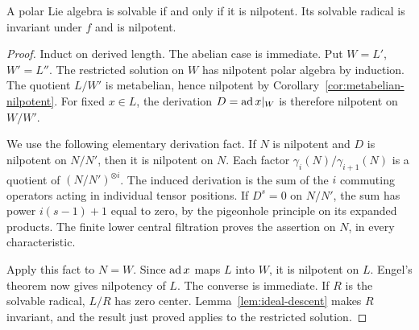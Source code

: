 \begin{theorem}\label{thm:solvable-nilpotent}
A polar Lie algebra is solvable if and only if it is nilpotent.
Its solvable radical is invariant under \(f\) and is nilpotent.
\end{theorem}
\begin{proof}
Induct on derived length. The abelian case is immediate.
Put \(W=L'\), \(W'=L''\). The restricted solution on \(W\) has
nilpotent polar algebra by induction. The quotient \(L/W'\) is
metabelian, hence nilpotent by Corollary~\ref{cor:metabelian-nilpotent}.
For fixed \(x\in L\), the derivation \(D=\operatorname{ad} x|_W\) is therefore
nilpotent on \(W/W'\).

We use the following elementary derivation fact. If \(N\) is nilpotent
and \(D\) is nilpotent on \(N/N'\), then it is nilpotent on \(N\).
Each factor \(\gamma_i(N)/\gamma_{i+1}(N)\) is a quotient of
\((N/N')^{\otimes i}\). The induced derivation is the sum of the \(i\)
commuting operators acting in individual tensor positions.
If \(D^s=0\) on \(N/N'\), the sum has power
\(i(s-1)+1\) equal to zero, by the pigeonhole principle on its expanded
products. The finite lower central filtration proves the assertion on
\(N\), in every characteristic.

Apply this fact to \(N=W\). Since \(\operatorname{ad} x\) maps \(L\) into \(W\),
it is nilpotent on \(L\). Engel's theorem now gives nilpotency of \(L\).
The converse is immediate. If \(R\) is the solvable radical,
\(L/R\) has zero center. Lemma~\ref{lem:ideal-descent} makes \(R\)
invariant, and the result just proved applies to the restricted solution.
\end{proof}
